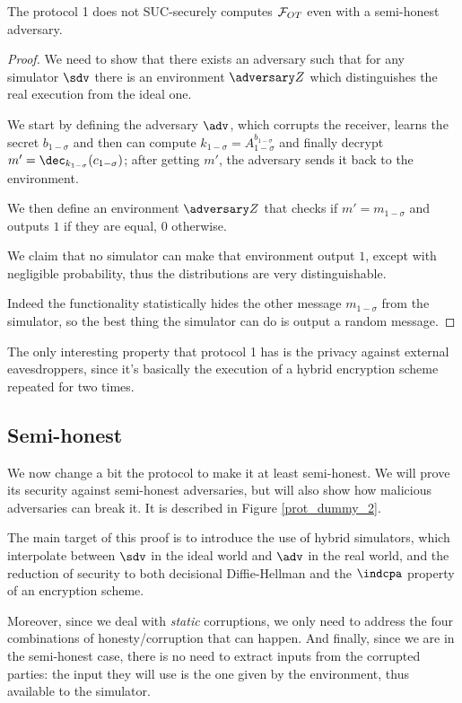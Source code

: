 \begin{proposition}
    The protocol 1 does not SUC-securely computes $\mathcal{F}_{OT}$ even with a semi-honest adversary.
\end{proposition}

\begin{proof}
    We need to show that there exists an adversary such that for any simulator $\sdv$ there is an environment $\zdv$ which distinguishes the real execution from the ideal one.

    We start by defining the adversary $\adv$, which corrupts the receiver, learns the secret $b_{1-\sigma}$ and then can compute $k_{1-\sigma} = A_{1-\sigma}^{b_{1-\sigma}}$ and finally decrypt $m'=\dec_{k_{1-\sigma}}(c_{1-\sigma})$; after getting $m'$, the adversary sends it back to the environment.

    We then define an environment $\zdv$ that checks if $m'=m_{1-\sigma}$ and outputs $1$ if they are equal, $0$ otherwise.

    We claim that no simulator can make that environment output $1$, except with negligible probability, thus the distributions are very distinguishable.

    Indeed the functionality statistically hides the other message $m_{1-\sigma}$ from the simulator, so the best thing the simulator can do is output a random message.
\end{proof}

The only interesting property that protocol 1 has is the privacy against external eavesdroppers, since it's basically the execution of a hybrid encryption scheme repeated for two times.


\subsection{Semi-honest}
We now change a bit the protocol to make it at least semi-honest. We will prove its security against semi-honest adversaries, but will also show how malicious adversaries can break it. It is described in Figure \ref{prot_dummy_2}.

The main target of this proof is to introduce the use of hybrid simulators, which interpolate between $\sdv$ in the ideal world and $\adv$ in the real world, and the reduction of security to both decisional Diffie-Hellman and the $\indcpa$ property of an encryption scheme.

Moreover, since we deal with \emph{static} corruptions, we only need to address the four combinations of honesty/corruption that can happen. And finally, since we are in the semi-honest case, there is no need to extract inputs from the corrupted parties: the input they will use is the one given by the environment, thus available to the simulator.

